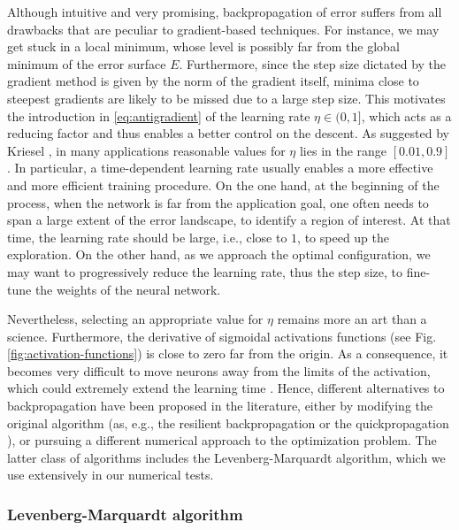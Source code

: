\documentclass[12pt, a4paper, twoside, openright, notitlepage]{report}
\numberwithin{equation}{chapter}
\theoremstyle{theorem}
\theoremstyle{definition}
\theoremstyle{remark}
\theoremstyle{proposition}
\numberwithin{figure}{chapter}
\begin{document}
		Although intuitive and very promising, backpropagation of error suffers from all drawbacks that are peculiar to gradient-based techniques. For instance, we may get stuck in a local minimum, whose level is possibly far from the global minimum of the error surface $E$. Furthermore, since the step size dictated by the gradient method is given by the norm of the gradient itself, minima close to steepest gradients are likely to be missed due to a large step size. This motivates the introduction in \eqref{eq:antigradient} of the learning rate $\eta \in (0,1]$, which acts as a reducing factor and thus enables a better control on the descent. As suggested by Kriesel \cite{Kri07}, in many applications reasonable values for $\eta$ lies in the range $[0.01,0.9]$. In particular, a time-dependent learning rate usually enables a more effective and more efficient training procedure. On the one hand, at the beginning of the process, when the network is far from the application goal, one often needs to span a large extent of the error landscape, to identify a region of interest. At that time, the learning rate should be large, i.e., close to $1$, to speed up the exploration. On the other hand, as we approach the optimal configuration, we may want to progressively reduce the learning rate, thus the step size, to fine-tune the weights of the neural network. 
		
		Nevertheless, selecting an appropriate value for $\eta$ remains more an art than a science. Furthermore, the derivative of sigmoidal activations functions (see Fig. \ref{fig:activation-functions}) is close to zero far from the origin. As a consequence, it becomes very difficult to move neurons away from the limits of the activation, which could extremely extend the learning time \cite{Kri07}. Hence, different alternatives to backpropagation have been proposed in the literature, either by modifying the original algorithm (as, e.g., the resilient backpropagation \cite{RB93} or the quickpropagation \cite{Fah88}), or pursuing a different numerical approach to the optimization problem. The latter class of algorithms includes the Levenberg-Marquardt algorithm, which we use extensively in our numerical tests.
				
		\subsubsection{Levenberg-Marquardt algorithm}
		\label{section:Levenberg-Marquardt algorithm}
		
\end{document}
